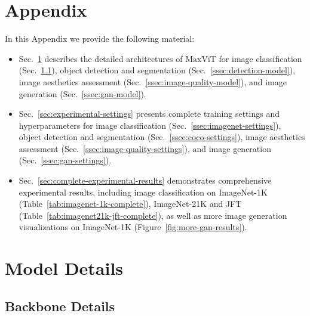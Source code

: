 \documentclass[runningheads]{llncs}
\begin{document}
\appendix
\section*{Appendix}

In this Appendix we provide the following material:

\begin{itemize}
\item Sec.~\ref{sec:model-details} describes the detailed architectures of MaxViT for image classification (Sec.~\ref{ssec:main-model}), object detection and segmentation (Sec.~\ref{ssec:detection-model}), image aesthetics assessment (Sec.~\ref{ssec:image-quality-model}), and image generation (Sec.~\ref{ssec:gan-model}). 
\item Sec.~\ref{sec:experimental-settings} presents complete training settings and hyperparameters for image classification (Sec.~\ref{ssec:imagenet-settings}), object detection and segmentation (Sec.~\ref{ssec:coco-settings}), image aesthetics assessment (Sec.~\ref{ssec:image-quality-settings}), and image generation (Sec.~\ref{ssec:gan-settings}). 
\item Sec.~\ref{sec:complete-experimental-results} demonstrates comprehensive experimental results, including image classification on ImageNet-1K (Table~\ref{tab:imagenet-1k-complete}), ImageNet-21K and JFT (Table~\ref{tab:imagenet21k-jft-complete}), as well as more image generation visualizations on ImageNet-1K (Figure~\ref{fig:more-gan-results}).

\end{itemize}

\section{Model Details}
\label{sec:model-details}

\subsection{Backbone Details}
\label{ssec:main-model}
\end{document}
